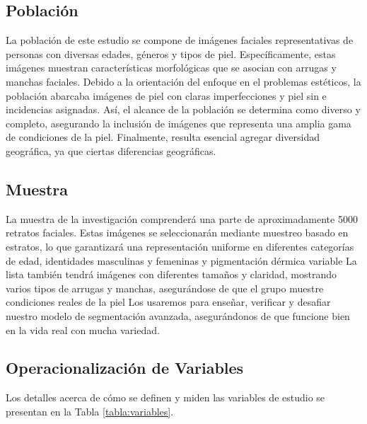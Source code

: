 \subsection{Población}
La población de este estudio se compone de imágenes faciales representativas de personas con diversas edades, géneros y tipos de piel. Específicamente, estas imágenes muestran características morfológicas que se asocian con arrugas y manchas faciales. Debido a la orientación del enfoque en el problemas estéticos, la población abarcaba imágenes de piel con claras imperfecciones y piel sin e incidencias asignadas. Así, el alcance de la población se determina como diverso y completo, asegurando la inclusión de imágenes que representa una amplia gama de condiciones de la piel. Finalmente, resulta esencial agregar diversidad geográfica, ya que ciertas diferencias geográficas.
\subsection{Muestra}
La muestra de la investigación comprenderá una parte de aproximadamente 5000 retratos faciales. Estas imágenes se seleccionarán mediante muestreo basado en estratos, lo que garantizará una representación uniforme en diferentes categorías de edad, identidades masculinas y femeninas y pigmentación dérmica variable La lista también tendrá imágenes con diferentes tamaños y claridad, mostrando varios tipos de arrugas y manchas, asegurándose de que el grupo muestre condiciones reales de la piel Los usaremos para enseñar, verificar y desafiar nuestro modelo de segmentación avanzada, asegurándonos de que funcione bien en la vida real con mucha variedad.

\subsection{Operacionalización de Variables}
Los detalles acerca de cómo se definen y miden las variables de estudio se presentan en la Tabla \ref{tabla:variables}.


